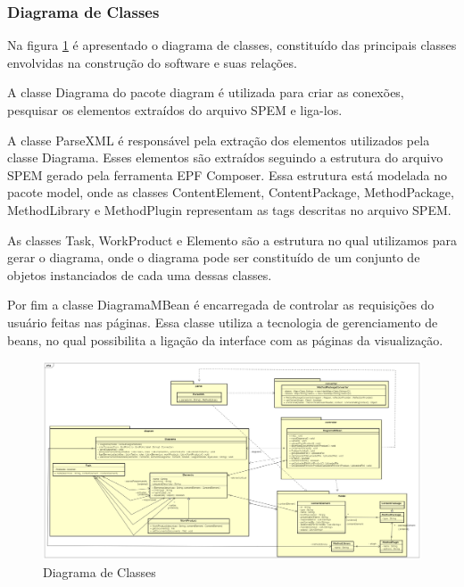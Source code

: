 \subsubsection{Diagrama de Classes}\label{subsection:classes}
Na figura \ref{figura:diagramaclasses} é apresentado o diagrama de classes, constituído das principais classes envolvidas na construção do software e suas relações.

A classe Diagrama do pacote diagram é utilizada para criar as conexões, pesquisar os elementos extraídos do arquivo SPEM e liga-los.

A classe ParseXML é responsável pela extração dos elementos utilizados pela classe Diagrama. Esses elementos são extraídos seguindo a estrutura do arquivo SPEM gerado pela ferramenta EPF Composer. Essa estrutura está modelada no pacote model, onde as classes ContentElement, ContentPackage, MethodPackage, MethodLibrary e MethodPlugin representam as tags descritas no arquivo SPEM.

As classes Task, WorkProduct e Elemento são a estrutura no qual utilizamos para gerar o diagrama, onde o diagrama pode ser constituído de um conjunto de objetos instanciados de cada uma dessas classes.

Por fim a classe DiagramaMBean é encarregada de controlar as requisições do usuário feitas nas páginas. Essa classe utiliza a tecnologia de gerenciamento de beans, no qual possibilita a ligação da interface com as páginas da visualização.

\begin{figure}[!htb]
	\caption{Diagrama de Classes}
	\label{figura:diagramaclasses}
	\centering
	\includegraphics[width=1\textwidth]{img/ferramenta_diagrama_classes.png}
\end{figure}


